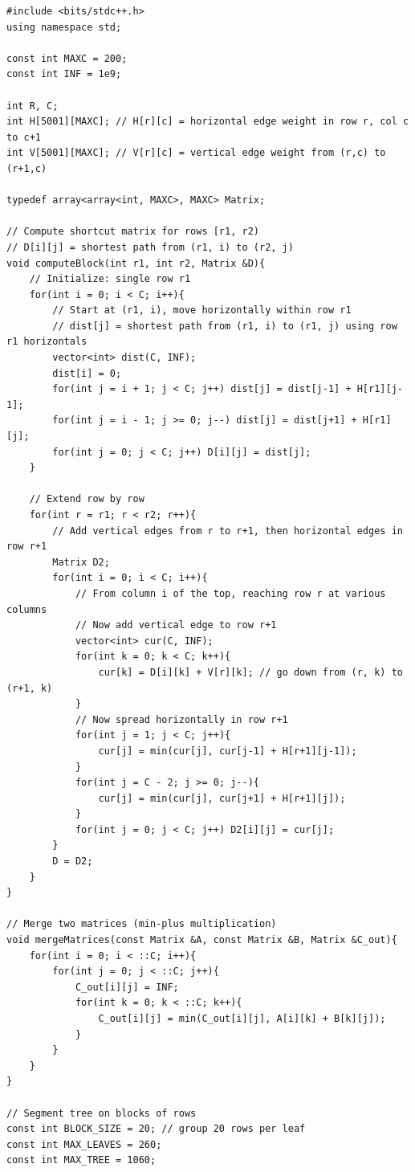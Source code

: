 \documentclass[11pt,a4paper]{article}
\begin{document}
\begin{lstlisting}
#include <bits/stdc++.h>
using namespace std;

const int MAXC = 200;
const int INF = 1e9;

int R, C;
int H[5001][MAXC]; // H[r][c] = horizontal edge weight in row r, col c to c+1
int V[5001][MAXC]; // V[r][c] = vertical edge weight from (r,c) to (r+1,c)

typedef array<array<int, MAXC>, MAXC> Matrix;

// Compute shortcut matrix for rows [r1, r2)
// D[i][j] = shortest path from (r1, i) to (r2, j)
void computeBlock(int r1, int r2, Matrix &D){
    // Initialize: single row r1
    for(int i = 0; i < C; i++){
        // Start at (r1, i), move horizontally within row r1
        // dist[j] = shortest path from (r1, i) to (r1, j) using row r1 horizontals
        vector<int> dist(C, INF);
        dist[i] = 0;
        for(int j = i + 1; j < C; j++) dist[j] = dist[j-1] + H[r1][j-1];
        for(int j = i - 1; j >= 0; j--) dist[j] = dist[j+1] + H[r1][j];
        for(int j = 0; j < C; j++) D[i][j] = dist[j];
    }

    // Extend row by row
    for(int r = r1; r < r2; r++){
        // Add vertical edges from r to r+1, then horizontal edges in row r+1
        Matrix D2;
        for(int i = 0; i < C; i++){
            // From column i of the top, reaching row r at various columns
            // Now add vertical edge to row r+1
            vector<int> cur(C, INF);
            for(int k = 0; k < C; k++){
                cur[k] = D[i][k] + V[r][k]; // go down from (r, k) to (r+1, k)
            }
            // Now spread horizontally in row r+1
            for(int j = 1; j < C; j++){
                cur[j] = min(cur[j], cur[j-1] + H[r+1][j-1]);
            }
            for(int j = C - 2; j >= 0; j--){
                cur[j] = min(cur[j], cur[j+1] + H[r+1][j]);
            }
            for(int j = 0; j < C; j++) D2[i][j] = cur[j];
        }
        D = D2;
    }
}

// Merge two matrices (min-plus multiplication)
void mergeMatrices(const Matrix &A, const Matrix &B, Matrix &C_out){
    for(int i = 0; i < ::C; i++){
        for(int j = 0; j < ::C; j++){
            C_out[i][j] = INF;
            for(int k = 0; k < ::C; k++){
                C_out[i][j] = min(C_out[i][j], A[i][k] + B[k][j]);
            }
        }
    }
}

// Segment tree on blocks of rows
const int BLOCK_SIZE = 20; // group 20 rows per leaf
const int MAX_LEAVES = 260;
const int MAX_TREE = 1060;


\end{lstlisting}
\end{document}
